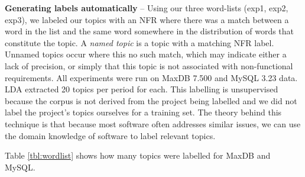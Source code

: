 \documentclass[]{sig-alternate}
\begin{document}
\noindent \textbf{Generating labels automatically} -- Using our three word-lists (\textsf{exp1}, \textsf{exp2}, \textsf{exp3}), we labeled our topics with an NFR where there was a match between a word in the list and the same word somewhere in the distribution of words that constitute the topic.
A \emph{named topic} is a topic with a matching NFR label. Unnamed topics occur where this no such match, which may indicate either a lack of precision, or simply that this topic is not associated with non-functional requirements.
All experiments were run on MaxDB 7.500 and MySQL 3.23 data. LDA
extracted 20 topics per period for each.
This labelling is unsupervised because the corpus is not derived from 
the project being labelled and we did not label the project's topics
ourselves for a training set. The theory behind this technique is that
because most software often addresses similar issues, we can use the
domain knowledge of software to label relevant topics.

Table \ref{tbl:wordlist} shows how many topics were labelled for MaxDB
and MySQL.
\end{document}
